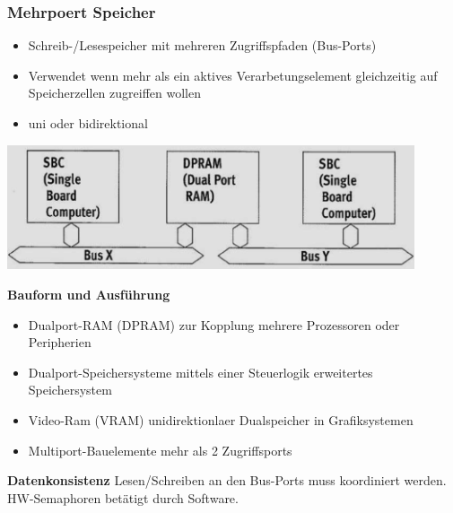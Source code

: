 \subsubsection{Mehrpoert Speicher}
\begin{itemize}
    \item Schreib-/Lesespeicher mit mehreren Zugriffspfaden (Bus-Ports)
    \item Verwendet wenn mehr als ein aktives Verarbetungselement gleichzeitig auf Speicherzellen zugreiffen wollen
    \item uni oder bidirektional
\end{itemize}
\begin{minipage}{0.5\linewidth}
    \includegraphics[width=0.9\textwidth]{images/SystembusSpeicherSpeichersystem/SpeicherSysMehrPort}
\end{minipage}\newline
\begin{minipage}{0.6\linewidth}
    \textbf{Bauform und Ausführung}
    \begin{itemize}
        \item Dualport-RAM (DPRAM)
        \subitem zur Kopplung mehrere Prozessoren oder Peripherien
        \item Dualport-Speichersysteme
        \subitem mittels einer Steuerlogik erweitertes Speichersystem
        \item Video-Ram (VRAM)
        \subitem unidirektionlaer Dualspeicher in Grafiksystemen
        \item Multiport-Bauelemente
        \subitem mehr als 2 Zugriffsports
    \end{itemize}
\end{minipage}
\begin{minipage}{0.4\linewidth}
    \textbf{Datenkonsistenz}\newline
    Lesen/Schreiben an den Bus-Ports muss koordiniert werden. HW-Semaphoren betätigt durch Software.
\end{minipage}

